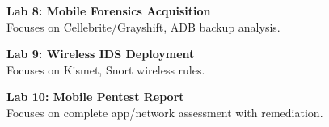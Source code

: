 \vspace{0.2cm}

\noindent\textbf{Lab 8: Mobile Forensics Acquisition} \\
Focuses on Cellebrite/Grayshift, ADB backup analysis.

\vspace{0.2cm}

\noindent\textbf{Lab 9: Wireless IDS Deployment} \\
Focuses on Kismet, Snort wireless rules.

\vspace{0.2cm}

\noindent\textbf{Lab 10: Mobile Pentest Report} \\
Focuses on complete app/network assessment with remediation.

\vspace{0.2cm}

\newpage
{}
